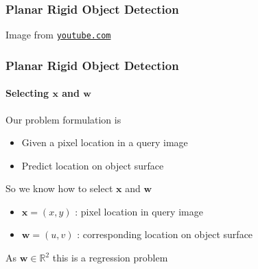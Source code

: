 \documentclass[xetex,professionalfont]{beamer}
\newcommand{\RR}{\mathbb{R}}
\renewcommand{\vec}[1]{\ensuremath{\mathbf{#1}}}
\newcommand{\vw}{\vec{w}}
\newcommand{\vx}{\vec{x}}
\renewcommand\emph[1]{\textcolor{tuwcvl_inf_red}{#1}}
\begin{document}

\begin{frame}
\frametitle{Planar Rigid Object Detection}

\begin{center}
    {\centering Image from \href{https://www.youtube.com/watch?v=ChGW2Jogdjs}{\texttt{youtube.com}}}
\end{center}

\end{frame}


\begin{frame}
\frametitle{Planar Rigid Object Detection}
\framesubtitle{Selecting $\vx$ and $\vw$}

Our problem formulation is  %
\begin{itemize}
	\item Given a pixel location in a query image
	\item Predict location on object surface  %
\end{itemize}

\bigskip
So we know how to select $\vx$ and $\vw$
\begin{itemize}
	\item $\vx=(x,y)$ : pixel location in query image
	\item $\vw=(u,v)$ : corresponding location on object surface
\end{itemize}

\bigskip
As $\vw\in\RR^2$ this is a \emph{regression problem}

\end{frame}

\end{document}
